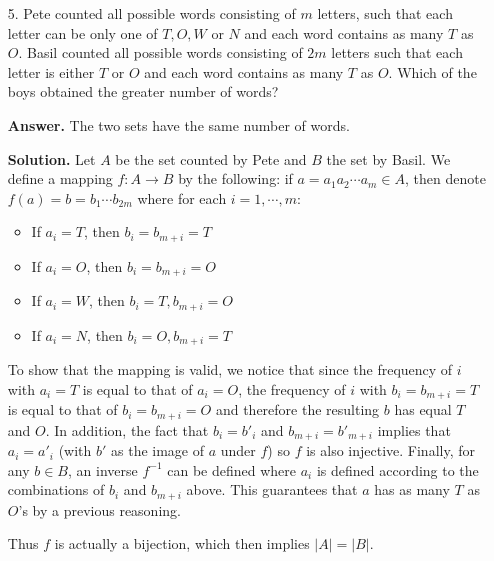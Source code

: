 \documentclass[11pt,a4paper]{article}
\begin{document}
\begin{enumerate}
	\item[5.] Pete counted all possible words consisting of $m$ letters, such that each letter can be only one of $T, O, W$ or $N$ and each word contains as many $T$ as $O$. Basil counted all possible words consisting of $2m$ letters such that each letter is either $T$ or $O$ and each word contains as many $T$ as $O$. Which of the boys obtained the greater number of words?
	
	\textbf{Answer.} The two sets have the same number of words. 
	
	\textbf{Solution.} Let $A$ be the set counted by Pete and $B$ the set by Basil. We define a mapping $f:A\to B$ by the following: if $a=a_1a_2\cdots a_m\in A$, then denote $f(a)=b=b_1\cdots b_{2m}$ where for each $i=1, \cdots , m$: 
	\begin{itemize}
		\item If $a_i=T$, then $b_i=b_{m+i}=T$
		\item If $a_i=O$, then $b_i=b_{m+i}=O$
		\item If $a_i=W$, then $b_i=T, b_{m+i}=O$
		\item If $a_i=N$, then $b_i=O, b_{m+i}=T$
	\end{itemize}
	To show that the mapping is valid, we notice that since the frequency of $i$ with $a_i=T$ is equal to that of $a_i=O$, the frequency of $i$ with $b_i=b_{m+i}=T$ is equal to that of $b_i=b_{m+i}=O$ and therefore the resulting $b$ has equal $T$ and $O$. In addition, the fact that $b_i=b'_i$ and $b_{m+i}=b'_{m+i}$ implies that $a_i=a'_i$ (with $b'$ as the image of $a$ under $f$) so $f$ is also injective. Finally, for any $b\in B$, an inverse $f^{-1}$ can be defined where $a_i$ is defined according to the combinations of $b_i$ and $b_{m+i}$ above. This guarantees that $a$ has as many $T$ as $O$'s by a previous reasoning. 
	
	Thus $f$ is actually a bijection, which then implies $|A|=|B|$. 
\end{enumerate}
\end{document}
